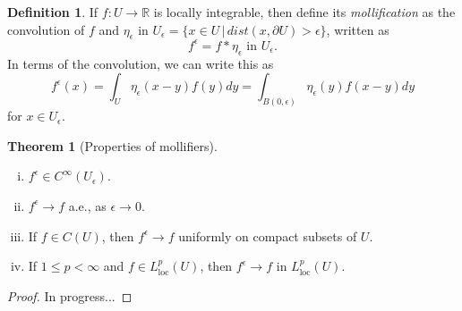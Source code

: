 \documentclass[11pt]{article}
\theoremstyle{definition}
\newtheorem*{theorem}{Theorem}
\newtheorem*{definition}{Definition}
\begin{document}
\begin{definition}
	If $f : U \rightarrow \mathbb{R}$ is locally integrable, then define its \textit{mollification} as
	the convolution of $f$ and $\eta_{\epsilon}$ in $U_{\epsilon} = \{x\in U \,|\, dist(x,\partial U) > \epsilon \}$, written as
	\begin{equation*}
		f^{\epsilon} = f * \eta_{\epsilon} \text{ in } U_{\epsilon}.
	\end{equation*}
	In terms of the convolution, we can write this as
	\begin{equation*}
		f^{\epsilon}(x) = \int_U \eta_{\epsilon}(x-y)f(y)dy = \int_{B(0,\epsilon)} \eta_{\epsilon}(y)f(x-y)dy
	\end{equation*}
	for $x \in U_{\epsilon}$.
\end{definition}
\begin{theorem}[Properties of mollifiers]~ 
	\begin{enumerate}[(i)]
		\item $f^{\epsilon} \in C^{\infty}(U_{\epsilon})$.
		\item $f^{\epsilon} \rightarrow f$ a.e., as $\epsilon \rightarrow 0$.
		\item If $f \in C(U)$, then $f^{\epsilon} \rightarrow f$ uniformly on compact subsets of $U$.
		\item If $1\leq p < \infty$ and $f \in L_{\text{loc}}^p(U)$, then $f^{\epsilon} \rightarrow f$ in $L_{\text{loc}}^p(U)$.
	\end{enumerate}
\end{theorem}
\begin{proof}
	In progress...
\end{proof}


\newpage
\end{document}
